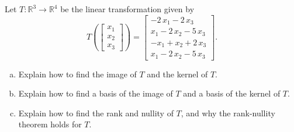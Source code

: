 
\begin{exerciseStatement}
 Let \(T:\mathbb{R}^ 3  \to \mathbb{R}^ 4 \) be the linear transformation given by \[T\left(  \left[\begin{array}{c}
x_{1} \\
x_{2} \\
x_{3}
\end{array}\right]  \right) =  \left[\begin{array}{c}
-2 \, x_{1} - 2 \, x_{3} \\
x_{1} - 2 \, x_{2} - 5 \, x_{3} \\
-x_{1} + x_{2} + 2 \, x_{3} \\
x_{1} - 2 \, x_{2} - 5 \, x_{3}
\end{array}\right] .\]
\begin{enumerate}[(a)]
\item Explain how to find the image of \(T\) and the kernel of \(T\).
\item Explain how to find a basis of the image of \(T\) and a basis of the kernel of \(T\).
\item Explain how to find the rank and nullity of \(T\), and why the rank-nullity theorem holds for \(T\).
\end{enumerate}
    
\end{exerciseStatement}
    

